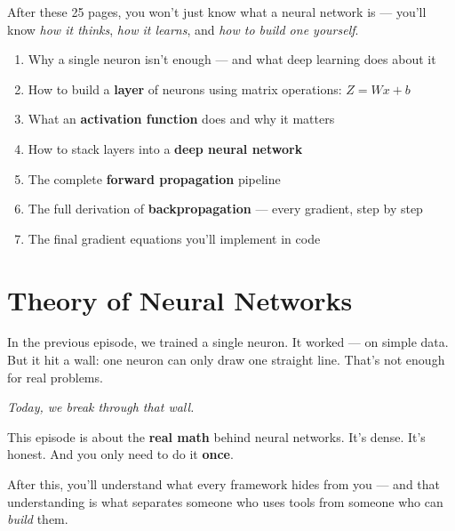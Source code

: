 \documentclass[11pt]{article}
\begin{document}
\tableofcontents

\vspace{1.5em}

\begin{defbox}[title=What You'll Learn in This Episode]
After these 25 pages, you won't just know what a neural network is --- you'll know \textit{how it thinks}, \textit{how it learns}, and \textit{how to build one yourself}.

\begin{enumerate}[label=\textbf{\arabic*.}]
  \item Why a single neuron isn't enough --- and what deep learning does about it
  \item How to build a \textbf{layer} of neurons using matrix operations: $Z = Wx + b$
  \item What an \textbf{activation function} does and why it matters
  \item How to stack layers into a \textbf{deep neural network}
  \item The complete \textbf{forward propagation} pipeline
  \item The full derivation of \textbf{backpropagation} --- every gradient, step by step
  \item The final gradient equations you'll implement in code
\end{enumerate}
\end{defbox}

\newpage

\section{Theory of Neural Networks}

In the previous episode, we trained a single neuron.
It worked --- on simple data.
But it hit a wall: one neuron can only draw one straight line.
That's not enough for real problems.

\textit{Today, we break through that wall.}

\begin{recapbox}[title=What's Ahead]
This episode is about the \textbf{real math} behind neural networks.
It's dense. It's honest. And you only need to do it \textbf{once}.

After this, you'll understand what every framework hides from you ---
and that understanding is what separates someone who uses tools
from someone who can \textit{build} them.
\end{recapbox}
\end{document}
